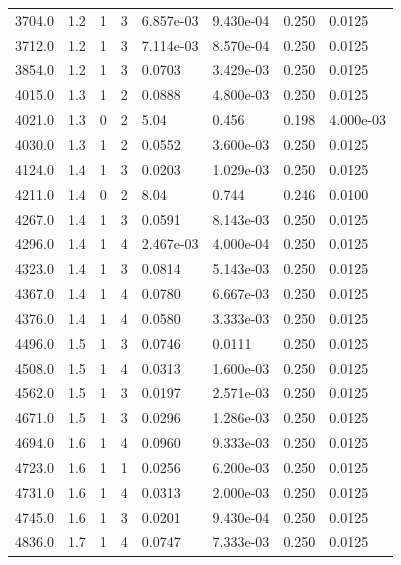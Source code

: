 \documentclass[preview]{standalone}
\begin{document}
{{{\begin{tabular}{L{1.2cm}C{1.2cm} C{0.3cm}C{0.5cm} C{1.4cm}C{1.4cm} C{1.4cm}C{1.4cm}}
  3704.0  &   1.2  & 1     &  3 &  6.857e-03  & 9.430e-04  & 0.250 &  0.0125   \\ 
  3712.0  &   1.2  & 1     &  3 &  7.114e-03  & 8.570e-04  & 0.250 &  0.0125   \\ 
  3854.0  &   1.2  & 1     &  3 &  0.0703  & 3.429e-03  & 0.250 &  0.0125   \\ 
  4015.0  &   1.3  & 1     &  2 &  0.0888  & 4.800e-03  & 0.250 &  0.0125   \\ 
  4021.0  &   1.3  & 0     &  2 &  5.04  & 0.456  & 0.198 &  4.000e-03   \\ 
  4030.0  &   1.3  & 1     &  2 &  0.0552  & 3.600e-03  & 0.250 &  0.0125   \\ 
  4124.0  &   1.4  & 1     &  3 &  0.0203  & 1.029e-03  & 0.250 &  0.0125   \\ 
  4211.0  &   1.4  & 0     &  2 &  8.04  & 0.744  & 0.246 &  0.0100   \\ 
  4267.0  &   1.4  & 1     &  3 &  0.0591  & 8.143e-03  & 0.250 &  0.0125   \\ 
  4296.0  &   1.4  & 1     &  4 &  2.467e-03  & 4.000e-04  & 0.250 &  0.0125   \\ 
  4323.0  &   1.4  & 1     &  3 &  0.0814  & 5.143e-03  & 0.250 &  0.0125   \\ 
  4367.0  &   1.4  & 1     &  4 &  0.0780  & 6.667e-03  & 0.250 &  0.0125   \\ 
  4376.0  &   1.4  & 1     &  4 &  0.0580  & 3.333e-03  & 0.250 &  0.0125   \\ 
  4496.0  &   1.5  & 1     &  3 &  0.0746  & 0.0111  & 0.250 &  0.0125   \\ 
  4508.0  &   1.5  & 1     &  4 &  0.0313  & 1.600e-03  & 0.250 &  0.0125   \\ 
  4562.0  &   1.5  & 1     &  3 &  0.0197  & 2.571e-03  & 0.250 &  0.0125   \\ 
  4671.0  &   1.5  & 1     &  3 &  0.0296  & 1.286e-03  & 0.250 &  0.0125   \\ 
  4694.0  &   1.6  & 1     &  4 &  0.0960  & 9.333e-03  & 0.250 &  0.0125   \\ 
  4723.0  &   1.6  & 1     &  1 &  0.0256  & 6.200e-03  & 0.250 &  0.0125   \\ 
  4731.0  &   1.6  & 1     &  4 &  0.0313  & 2.000e-03  & 0.250 &  0.0125   \\ 
  4745.0  &   1.6  & 1     &  3 &  0.0201  & 9.430e-04  & 0.250 &  0.0125   \\ 
  4836.0  &   1.7  & 1     &  4 &  0.0747  & 7.333e-03  & 0.250 &  0.0125   \\ 

\end{tabular}}}}
\end{document}

